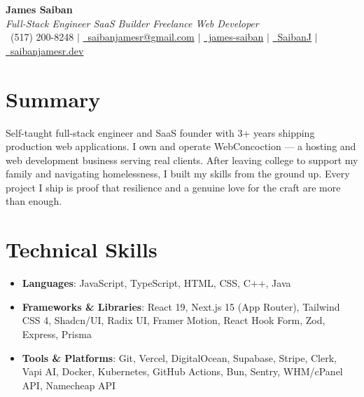 \documentclass[letterpaper,10pt]{article}
\newcommand{\resumeItem}[1]{\item \small{#1}}
\newcommand{\resumeSubHeadingList}{\begin{itemize}[leftmargin=0.15in, label={}, itemsep=-2pt]}
\newcommand{\resumeSubHeadingListEnd}{\end{itemize}}
\begin{document}
\begin{center}
  \textbf{\Huge James Saiban} \\[2pt]
  \textit{Full-Stack Engineer \textbar{} SaaS Builder \textbar{} Freelance Web Developer} \\[3pt]
  \small
  \faPhone\ (517) 200-8248 \;$|$\;
  \href{mailto:saibanjamesr@gmail.com}{\faEnvelope\ saibanjamesr@gmail.com} \;$|$\;
  \href{https://linkedin.com/in/james-saiban-ba3b60217}{\faLinkedin\ james-saiban} \;$|$\;
  \href{https://github.com/SaibanJ}{\faGithub\ SaibanJ} \;$|$\;
  \href{https://saibanjamesr.dev}{\faGlobe\ saibanjamesr.dev}
\end{center}

\vspace{-4pt}

\section*{Summary}
\small Self-taught full-stack engineer and SaaS founder with 3+ years shipping production web applications. I own and operate WebConcoction — a hosting and web development business serving real clients. After leaving college to support my family and navigating homelessness, I built my skills from the ground up. Every project I ship is proof that resilience and a genuine love for the craft are more than enough.

\vspace{-2pt}

\section{Technical Skills}
\resumeSubHeadingList
  \resumeItem{\textbf{Languages}: JavaScript, TypeScript, HTML, CSS, C++, Java}
  \resumeItem{\textbf{Frameworks \& Libraries}: React 19, Next.js 15 (App Router), Tailwind CSS 4, Shadcn/UI, Radix UI, Framer Motion, React Hook Form, Zod, Express, Prisma}
  \resumeItem{\textbf{Tools \& Platforms}: Git, Vercel, DigitalOcean, Supabase, Stripe, Clerk, Vapi AI, Docker, Kubernetes, GitHub Actions, Bun, Sentry, WHM/cPanel API, Namecheap API}
\resumeSubHeadingListEnd

\vspace{-2pt}

\end{document}
